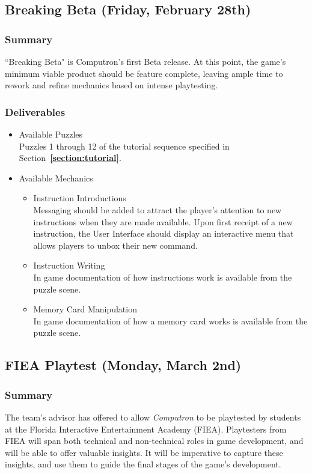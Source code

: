 \subsection{Breaking Beta (Friday, February 28th)}

\subsubsection*{Summary}
``Breaking Beta" is Computron's first Beta release. At this point, the game's minimum 
viable product should be feature complete, leaving ample time to rework and refine 
mechanics based on intense playtesting.

\subsubsection*{Deliverables}
\begin{itemize}
	\item Available Puzzles\\
	Puzzles 1 through 12 of the tutorial sequence specified in Section~\textbf{\ref{section:tutorial}}.
	\item Available Mechanics
	\begin{itemize}
		\item Instruction Introductions\\
		Messaging should be added to attract the player's attention to new instructions 
		when they are made available. Upon first receipt of a new instruction, the User 
		Interface should display an interactive menu that allows players to unbox their 
		new command.
		\item Instruction Writing\\
		In game documentation of how instructions work is available from the puzzle scene.
		\item Memory Card Manipulation\\
		In game documentation of how a memory card works is available from the puzzle scene.
	\end{itemize}
\end{itemize}

\subsection{FIEA Playtest (Monday, March 2nd)}

\subsubsection*{Summary}
The team's advisor has offered to allow \textit{Computron} to be playtested by students 
at the Florida Interactive Entertainment Academy (FIEA). Playtesters from FIEA will span 
both technical and non-technical roles in game development, and will be able to offer 
valuable insights. It will be imperative to capture these insights, and use them to guide the 
final stages of the game's development.

